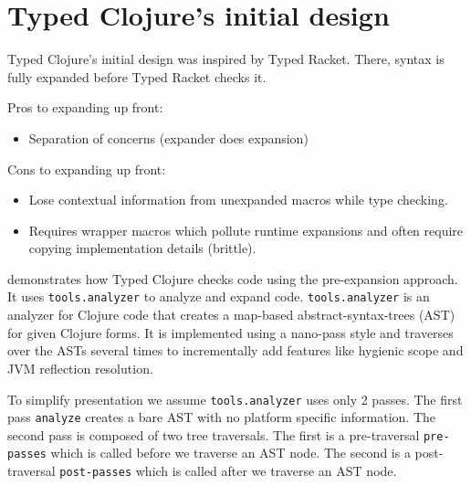 \chapter{Typed Clojure's initial design}

Typed Clojure's initial design was inspired by Typed Racket.
There, syntax is fully expanded before Typed Racket checks it.

Pros to expanding up front:

\begin{itemize}
  \item Separation of concerns (expander does expansion)
\end{itemize}

Cons to expanding up front:

\begin{itemize}
  \item Lose contextual information from unexpanded macros while type checking.
  \item Requires wrapper macros which pollute runtime expansions and
        often require copying implementation details (brittle).
\end{itemize}

 demonstrates 
how Typed Clojure checks code using the pre-expansion approach.
It uses \texttt{tools.analyzer} to analyze and expand code.
\texttt{tools.analyzer} is an analyzer for Clojure code that creates
a map-based abstract-syntax-trees (AST) for given Clojure forms.
It is implemented using a nano-pass style and traverses over the ASTs
several times to incrementally add features like hygienic scope
and JVM reflection resolution.

To simplify presentation we assume \texttt{tools.analyzer}
uses only 2 passes. The first pass \texttt{analyze} creates
a bare AST with no platform specific information.
The second pass is composed of two tree traversals.
The first is a pre-traversal \texttt{pre-passes} which
is called before we traverse an AST node.
The second is a post-traversal \texttt{post-passes} which
is called after we traverse an AST node.

